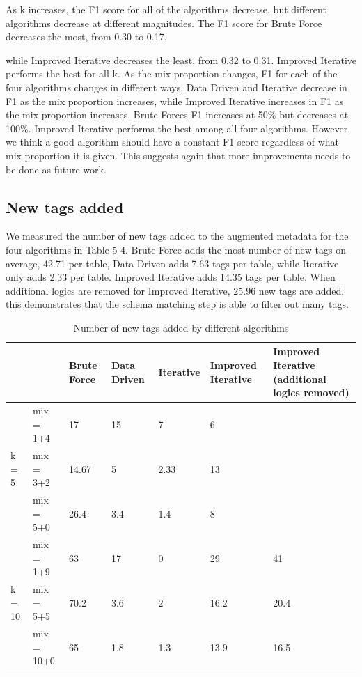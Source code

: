 As k increases, the F1 score for all of the algorithms decrease, but different algorithms decrease at different magnitudes. The F1 score for Brute Force decreases the most, from 0.30 to 0.17,

while Improved Iterative decreases the least, from 0.32 to 0.31. Improved Iterative performs the best for all k. As the mix proportion changes, F1 for each of the four algorithms changes in different ways. Data Driven and Iterative decrease in F1 as the mix proportion increases, while Improved Iterative increases in F1 as the mix proportion increases. Brute Forces F1 increases at 50\% but decreases at 100\%. Improved Iterative performs the best among all four algorithms.
However, we think a good algorithm should have a constant F1 score regardless of what mix proportion it is given. This suggests again that more improvements needs to be done as future work.

\subsection{New tags added}

We measured the number of new tags added to the augmented metadata for the four algorithms in Table 5-4. Brute Force adds the most number of new tags on average, 42.71 per table, Data Driven adds 7.63 tags per table, while Iterative only adds 2.33 per table. Improved Iterative adds 14.35 tags per table. When additional logics are removed for Improved Iterative, 25.96 new tags are added, this demonstrates that the schema matching step is able to filter out many tags.

\begin{table}[h!]
    \centering
    \scriptsize
    \begin{center}
      \caption{Number of new tags added by different algorithms}
      \label{tab:Number-of-new-tags-added-by-different-algorithms}
      \begin{tabular}{|p{}|p{}|p{}|p{}|p{}|p{}|p{}|}  
        \hline
         & & \textbf{Brute Force} & \textbf{Data Driven} & \textbf{Iterative} & \textbf{Improved Iterative} & \textbf{Improved Iterative (additional logics removed)}\\
        \hline
        \multirow{3}{*}{k = 5} & mix = 1+4 & 17 & 15 & 7 & 6 & \\
        \cline{2-7}
        & mix = 3+2 & 14.67 & 5 & 2.33 & 13 & \\
        \cline{2-7}
        & mix = 5+0 & 26.4 & 3.4 & 1.4 & 8 & \\
        \hline        
        \multirow{3}{*}{k = 10} & mix = 1+9 & 63 & 17 & 0 & 29 & 41 \\
        \cline{2-7}
        & mix = 5+5 & 70.2 & 3.6 & 2 & 16.2 & 20.4 \\
        \cline{2-7}
        & mix = 10+0 & 65 & 1.8 & 1.3 & 13.9 & 16.5 \\
        \hline
      \end{tabular}
    \end{center}
\end{table}

